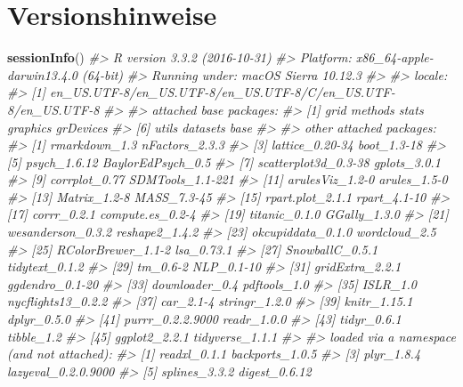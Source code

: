 \documentclass[12pt,]{book}
\makeatletter
\newenvironment{Shaded}{\begin{snugshade}}{\end{snugshade}}
\newcommand{\KeywordTok}[1]{\textcolor[rgb]{0.13,0.29,0.53}{\textbf{{#1}}}}
\newcommand{\CommentTok}[1]{\textcolor[rgb]{0.56,0.35,0.01}{\textit{{#1}}}}
\newcommand{\NormalTok}[1]{{#1}}
\newenvironment{kframe}{%
\medskip{}
\setlength{\fboxsep}{.8em}
 \def\at@end@of@kframe{}%
 \ifinner\ifhmode%
  \def\at@end@of@kframe{\end{minipage}}%
  \begin{minipage}{\columnwidth}%
 \fi\fi%
 \def\FrameCommand##1{\hskip\@totalleftmargin \hskip-\fboxsep
 \colorbox{shadecolor}{##1}\hskip-\fboxsep
     \hskip-\linewidth \hskip-\@totalleftmargin \hskip\columnwidth}%
 \MakeFramed {\advance\hsize-\width
   \@totalleftmargin\z@ \linewidth\hsize
   \@setminipage}}%
 {\par\unskip\endMakeFramed%
 \at@end@of@kframe}
\renewenvironment{Shaded}{\begin{kframe}}{\end{kframe}}
\makeatother
\begin{document}
\section{Versionshinweise}\label{versionshinweise}

\begin{Shaded}
\begin{Highlighting}[]
\KeywordTok{sessionInfo}\NormalTok{() }
\CommentTok{#> R version 3.3.2 (2016-10-31)}
\CommentTok{#> Platform: x86_64-apple-darwin13.4.0 (64-bit)}
\CommentTok{#> Running under: macOS Sierra 10.12.3}
\CommentTok{#> }
\CommentTok{#> locale:}
\CommentTok{#> [1] en_US.UTF-8/en_US.UTF-8/en_US.UTF-8/C/en_US.UTF-8/en_US.UTF-8}
\CommentTok{#> }
\CommentTok{#> attached base packages:}
\CommentTok{#> [1] grid      methods   stats     graphics  grDevices}
\CommentTok{#> [6] utils     datasets  base     }
\CommentTok{#> }
\CommentTok{#> other attached packages:}
\CommentTok{#>  [1] rmarkdown_1.3        nFactors_2.3.3      }
\CommentTok{#>  [3] lattice_0.20-34      boot_1.3-18         }
\CommentTok{#>  [5] psych_1.6.12         BaylorEdPsych_0.5   }
\CommentTok{#>  [7] scatterplot3d_0.3-38 gplots_3.0.1        }
\CommentTok{#>  [9] corrplot_0.77        SDMTools_1.1-221    }
\CommentTok{#> [11] arulesViz_1.2-0      arules_1.5-0        }
\CommentTok{#> [13] Matrix_1.2-8         MASS_7.3-45         }
\CommentTok{#> [15] rpart.plot_2.1.1     rpart_4.1-10        }
\CommentTok{#> [17] corrr_0.2.1          compute.es_0.2-4    }
\CommentTok{#> [19] titanic_0.1.0        GGally_1.3.0        }
\CommentTok{#> [21] wesanderson_0.3.2    reshape2_1.4.2      }
\CommentTok{#> [23] okcupiddata_0.1.0    wordcloud_2.5       }
\CommentTok{#> [25] RColorBrewer_1.1-2   lsa_0.73.1          }
\CommentTok{#> [27] SnowballC_0.5.1      tidytext_0.1.2      }
\CommentTok{#> [29] tm_0.6-2             NLP_0.1-10          }
\CommentTok{#> [31] gridExtra_2.2.1      ggdendro_0.1-20     }
\CommentTok{#> [33] downloader_0.4       pdftools_1.0        }
\CommentTok{#> [35] ISLR_1.0             nycflights13_0.2.2  }
\CommentTok{#> [37] car_2.1-4            stringr_1.2.0       }
\CommentTok{#> [39] knitr_1.15.1         dplyr_0.5.0         }
\CommentTok{#> [41] purrr_0.2.2.9000     readr_1.0.0         }
\CommentTok{#> [43] tidyr_0.6.1          tibble_1.2          }
\CommentTok{#> [45] ggplot2_2.2.1        tidyverse_1.1.1     }
\CommentTok{#> }
\CommentTok{#> loaded via a namespace (and not attached):}
\CommentTok{#>  [1] readxl_0.1.1        backports_1.0.5    }
\CommentTok{#>  [3] plyr_1.8.4          lazyeval_0.2.0.9000}
\CommentTok{#>  [5] splines_3.3.2       digest_0.6.12      }

\end{Highlighting}
\end{Shaded}
\end{document}
